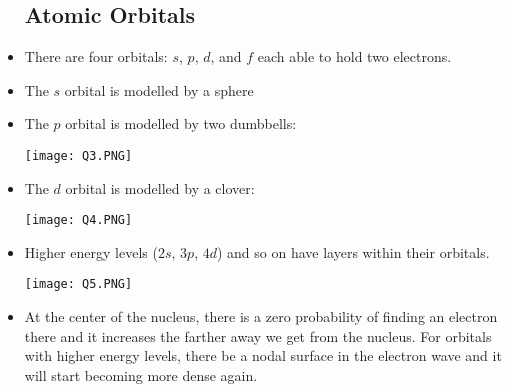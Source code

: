 \documentclass{article}
\begin{document}
\begin{itemize}
    \subsection{Atomic Orbitals}
    \item There are four orbitals: $s$, $p$, $d$, and $f$ each able to hold two electrons.
    \item The $s$ orbital is modelled by a sphere
    \begin{center}
    \end{center}
    \item The $p$ orbital is modelled by two dumbbells:
    \begin{center}\texttt{[image: Q3.PNG]}\end{center}
    \item The $d$ orbital is modelled by a clover:
    \begin{center}\texttt{[image: Q4.PNG]}\end{center}
    \item Higher energy levels ($2s$, $3p$, $4d$) and so on have layers within their orbitals.
    \begin{center}\texttt{[image: Q5.PNG]}\end{center}
    \item At the center of the nucleus, there is a zero probability of finding an electron there and it increases the farther away we get from the nucleus. For orbitals with higher energy levels, there be a nodal surface in the electron wave and it will start becoming more dense again.

\end{itemize}
\end{document}
